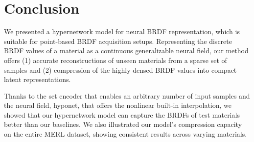 \section{Conclusion}\label{sec:conc}

We presented a hypernetwork model for neural BRDF representation, which is suitable for point-based BRDF acquisition setups. Representing the discrete BRDF values of a material as a continuous generalizable neural field, our method offers (1) accurate reconstructions of unseen materials from a sparse set of samples and (2) compression of the highly densed BRDF values into compact latent representations. 

Thanks to the set encoder that enables an arbitrary number of input samples and the neural field, hyponet, that offers the nonlinear built-in interpolation, we showed that our hypernetwork model can capture the BRDFs of test materials better than our baselines. We also illustrated our model's compression capacity on the entire MERL dataset, showing consistent results across varying materials.